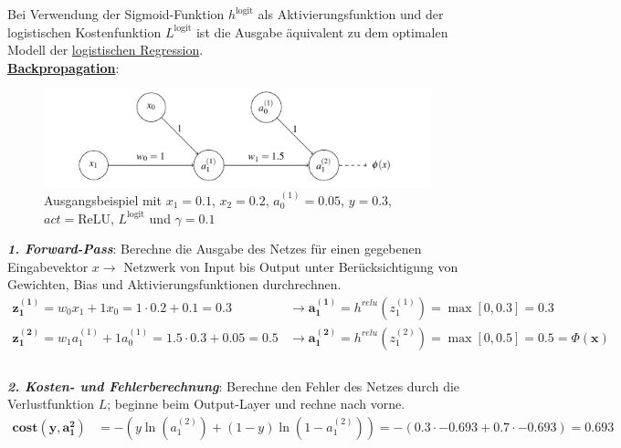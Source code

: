 Bei Verwendung der Sigmoid-Funktion $h^{\text{logit}}$ als Aktivierungsfunktion und der logistischen Kostenfunktion $L^{\text{logit}}$ ist die Ausgabe äquivalent zu dem optimalen Modell der \underline{logistischen Regression}.\\

\underline{\textbf{Backpropagation}}:\\
\begin{figure}[H]
    \centering
    \includegraphics[width=1\textwidth]{deepLearning/EinfachesANN.png}
    \caption{Ausgangsbeispiel mit $x_1=0.1$, $x_2=0.2$, $a_0^{(1)}=0.05$, $y=0.3$, $act=\text{ReLU}$, $L^{\text{logit}}$ und $\gamma=0.1$}
\end{figure}

\emph{\textbf{1. Forward-Pass}}: Berechne die Ausgabe des Netzes für einen gegebenen Eingabevektor $x \rightarrow$ Netzwerk von Input bis Output unter Berücksichtigung von Gewichten, Bias und Aktivierungsfunktionen durchrechnen.
\begin{equation*}
    \begin{aligned}
        \boldsymbol{z_1^{(1)}} = w_0x_1+1x_0=1\cdot0.2+0.1=0.3 &\longrightarrow \boldsymbol{a_1^{(1)}}=h^{relu}(z_1^{(1)}) = \max \left[ 0, 0.3\right] = 0.3\\
        \boldsymbol{z_1^{(2)}} = w_1a_1^{(1)}+1a_0^{(1)}=1.5\cdot0.3+0.05=0.5 &\longrightarrow \boldsymbol{a_1^{(2)}}=h^{relu}(z_1^{(2)}) = \max \left[ 0, 0.5\right] = 0.5 = \boldsymbol{\varPhi(x)}\\
    \end{aligned}
\end{equation*}\\

\emph{\textbf{2. Kosten- und Fehlerberechnung}}: Berechne den Fehler des Netzes durch die Verlustfunktion $L$; beginne beim Output-Layer und rechne nach vorne.
\begin{equation*}
    \begin{aligned}
        \boldsymbol{cost(y, a_1^{2})}  &= -(y\ln(a_1^{(2)})+(1-y)\ln(1-a_1^{(2)})) = -(0.3\cdot-0.693+0.7\cdot-0.693) = 0.693
    \end{aligned}
\end{equation*}

